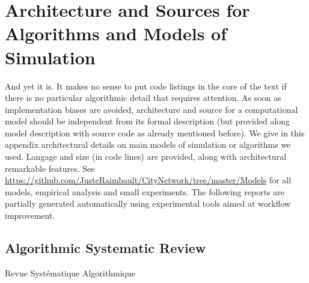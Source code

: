 


\chapter{Architecture and Sources for Algorithms and Models of Simulation} %

\label{app:code} %










And yet it is. It makes no sense to put code listings in the core of the text if there is no particular algorithmic detail that requires attention. As soon as implementation biases are avoided, architecture and source for a computational model should be independent from its formal description (but provided along model description with source code as already mentioned before). We give in this appendix architectural details on main models of simulation or algorithms we used. Langage and size (in code lines) are provided, along with architectural remarkable features. See \url{https://github.com/JusteRaimbault/CityNetwork/tree/master/Models} for all models, empirical analysis and small experiments. The following reports are partially generated automatically using experimental tools aimed at workflow improvement.




\section{Algorithmic Systematic Review}{Revue Systématique Algorithmique}

